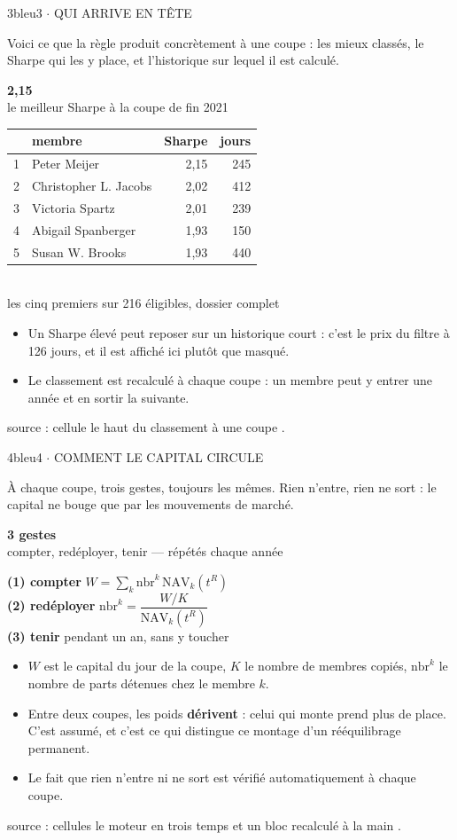 \documentclass[10pt,a4paper]{article}
\newcommand{\reponse}[1]{{\footnotesize #1\par}\vspace{1.1mm}}
\newcommand{\phare}[3]{%
  \begin{center}\vspace{-0.6mm}
  {\Large\bfseries\color{#3} #1}\\[0.4mm]{\footnotesize #2}
  \end{center}\vspace{0.6mm}}
\newcommand{\pts}[1]{{\footnotesize\begin{itemize}#1\end{itemize}}\vspace{0.9mm}}
\newcommand{\src}[1]{{\scriptsize\color{grisf} #1\par}}
\newlength{\colw}\setlength{\colw}{0.4865\textwidth}
\newcommand{\rangee}[2]{%
  \noindent\begin{minipage}[t]{\colw}\vspace{0pt}#1\end{minipage}%
  \hfill\begin{minipage}[t]{\colw}\vspace{0pt}#2\end{minipage}\par}
\begin{document}
\vfill
\rangee{\begin{etapebox}{3}{bleu}{3 $\cdot$ QUI ARRIVE EN TÊTE}
\reponse{Voici ce que la règle produit concrètement à une coupe : les mieux classés, le Sharpe qui les y
place, et l'historique sur lequel il est calculé.}
\phare{2,15}{le meilleur Sharpe à la coupe de fin 2021}{bleu}
\begin{center}\footnotesize
\begin{tabular}{@{}rlrr@{}}
\toprule
 & membre & Sharpe & jours \\
\midrule
1 & Peter Meijer & 2,15 & 245 \\
2 & Christopher L. Jacobs & 2,02 & 412 \\
3 & Victoria Spartz & 2,01 & 239 \\
4 & Abigail Spanberger & 1,93 & 150 \\
5 & Susan W. Brooks & 1,93 & 440 \\
\bottomrule
\end{tabular}\\[0.6mm]
{\footnotesize les cinq premiers sur 216 éligibles, dossier complet}
\end{center}
\vspace{0.8mm}
\pts{
\item Un Sharpe élevé peut reposer sur un historique court : c'est le prix du filtre à 126 jours, et il
est affiché ici plutôt que masqué.
\item Le classement est recalculé à chaque coupe : un membre peut y entrer une année et en sortir la
suivante.
}
\src{source : cellule \og le haut du classement à une coupe \fg{}.}
\end{etapebox}}{\begin{etapebox}{4}{bleu}{4 $\cdot$ COMMENT LE CAPITAL CIRCULE}
\reponse{À chaque coupe, trois gestes, toujours les mêmes. Rien n'entre, rien ne sort : le capital ne
bouge que par les mouvements de marché.}
\phare{3 gestes}{compter, redéployer, tenir --- répétés chaque année}{bleu}
\begin{center}\footnotesize
\textbf{(1) compter} \quad $W = \sum_k \mathrm{nbr}^k \, \mathrm{NAV}_k(t^R)$\\[0.8mm]
\textbf{(2) redéployer} \quad $\mathrm{nbr}^k = \dfrac{W/K}{\mathrm{NAV}_k(t^R)}$\\[0.8mm]
\textbf{(3) tenir} \quad pendant un an, sans y toucher
\end{center}
\vspace{0.8mm}
\pts{
\item $W$ est le capital du jour de la coupe, $K$ le nombre de membres copiés, $\mathrm{nbr}^k$ le nombre
de parts détenues chez le membre $k$.
\item Entre deux coupes, les poids \textbf{dérivent} : celui qui monte prend plus de place. C'est assumé,
et c'est ce qui distingue ce montage d'un rééquilibrage permanent.
\item Le fait que rien n'entre ni ne sort est vérifié automatiquement à chaque coupe.
}
\src{source : cellules \og le moteur en trois temps \fg{} et \og un bloc recalculé à la main \fg{}.}
\end{etapebox}}
\vfill
\newpage
\end{document}
